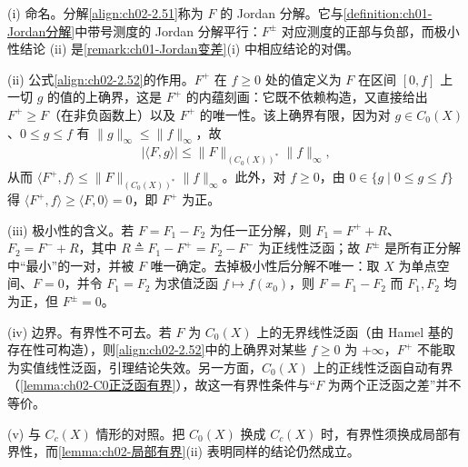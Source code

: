 \documentclass[../../main.tex]{subfiles}%
\begin{document}
\begin{remark}\label{remark:ch02-Jordan分解名}
(i) 命名。分解\eqref{align:ch02-2.51}称为 $F$ 的 Jordan 分解。它与\cref{definition:ch01-Jordan分解}中带号测度的 Jordan 分解平行：$F^\pm$ 对应测度的正部与负部，而极小性结论 (ii) 是\cref{remark:ch01-Jordan变差}(i) 中相应结论的对偶。

(ii) 公式\eqref{align:ch02-2.52}的作用。$F^+$ 在 $f\geqslant0$ 处的值定义为 $F$ 在区间 $[0,f]$ 上一切 $g$ 的值的上确界，这是 $F^+$ 的内蕴刻画：它既不依赖构造，又直接给出 $F^+\geqslant F$（在非负函数上）以及 $F^+$ 的唯一性。该上确界有限，因为对 $g\in C_0(X)$、$0\leqslant g\leqslant f$ 有 $\|g\|_\infty\leqslant\|f\|_\infty$，故
\begin{align*}
|\langle F,g\rangle|\leqslant\|F\|_{(C_0(X))^*}\|f\|_\infty,
\end{align*}
从而 $\langle F^+,f\rangle\leqslant\|F\|_{(C_0(X))^*}\|f\|_\infty$。此外，对 $f\geqslant0$，由 $0\in\{g\mid 0\leqslant g\leqslant f\}$ 得 $\langle F^+,f\rangle\geqslant\langle F,0\rangle=0$，即 $F^+$ 为正。

(iii) 极小性的含义。若 $F=F_1-F_2$ 为任一正分解，则 $F_1=F^++R$、$F_2=F^-+R$，其中 $R\triangleq F_1-F^+=F_2-F^-$ 为正线性泛函；故 $F^\pm$ 是所有正分解中“最小”的一对，并被 $F$ 唯一确定。去掉极小性后分解不唯一：取 $X$ 为单点空间、$F=0$，并令 $F_1=F_2$ 为求值泛函 $f\mapsto f(x_0)$，则 $F=F_1-F_2$ 而 $F_1,F_2$ 均为正，但 $F^\pm=0$。

(iv) 边界。有界性不可去。若 $F$ 为 $C_0(X)$ 上的无界线性泛函（由 Hamel 基的存在性可构造），则\eqref{align:ch02-2.52}中的上确界对某些 $f\geqslant0$ 为 $+\infty$，$F^+$ 不能取为实值线性泛函，引理结论失效。另一方面，$C_0(X)$ 上的正线性泛函自动有界（\cref{lemma:ch02-C0正泛函有界}），故这一有界性条件与“$F$ 为两个正泛函之差”并不等价。

(v) 与 $C_c(X)$ 情形的对照。把 $C_0(X)$ 换成 $C_c(X)$ 时，有界性须换成局部有界性，而\cref{lemma:ch02-局部有界}(ii) 表明同样的结论仍然成立。
\end{remark}
\end{document}
